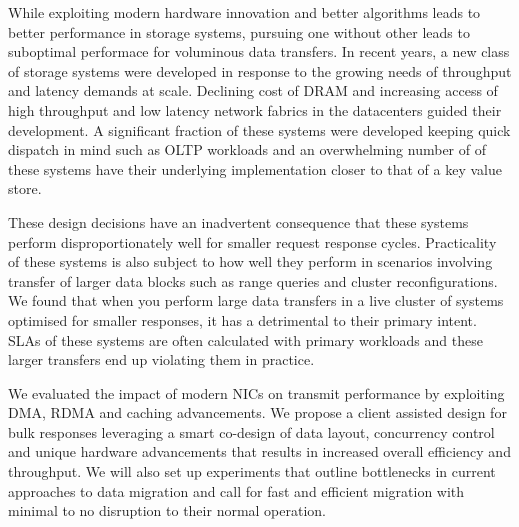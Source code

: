 

While exploiting modern hardware innovation and better algorithms leads to better performance 
in storage systems, pursuing one without other leads to suboptimal performace for voluminous data transfers.
In recent years, a new class of storage systems were developed in response to
the growing needs of throughput and latency demands at scale. Declining cost of DRAM
and increasing access of high throughput and low latency network fabrics in the datacenters
guided their development. A significant fraction of these systems were developed 
keeping quick dispatch in mind such as OLTP workloads and an overwhelming number of
of these systems have their underlying implementation closer to that of a key value store.

These design decisions have an inadvertent consequence that these systems perform disproportionately
well for smaller request response cycles. Practicality of these systems is also subject to 
how well they perform in scenarios involving transfer of larger data blocks such as range queries 
and cluster reconfigurations. We found that when you perform large data transfers in a live cluster 
of systems optimised for smaller responses, it has a detrimental to their primary intent. 
SLAs of these systems are often calculated with primary workloads and these larger transfers end 
up violating them in practice.

We evaluated the impact of modern NICs on transmit performance by exploiting DMA, RDMA and 
caching advancements. We propose a client assisted design for bulk responses leveraging a 
smart co-design of data layout, concurrency control and unique hardware advancements that 
results in increased overall efficiency and throughput. We will also set up experiments
that outline bottlenecks in current approaches to data migration and call for fast and 
efficient migration with minimal to no disruption to their normal operation.